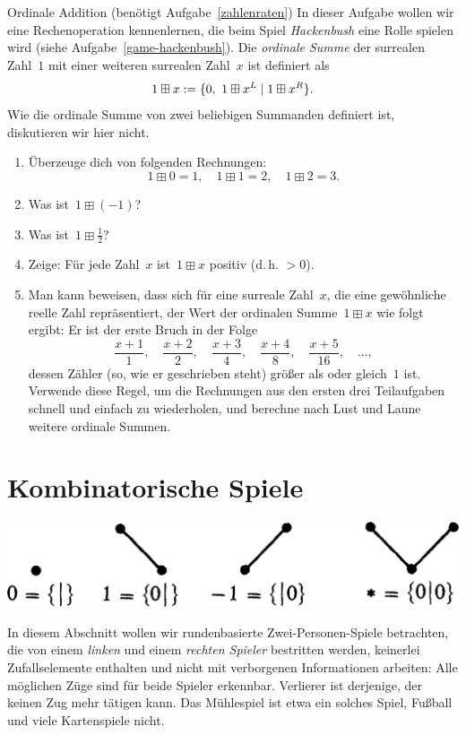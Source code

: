 \documentclass{zirkelblatt}
\newcommand{\head}[1]{\section*{\rmfamily #1}}%
\begin{document}
\begin{aufgabe}{Ordinale Addition (benötigt Aufgabe~\ref{zahlenraten})}
\label{ordinale-addition}
In dieser Aufgabe wollen wir eine Rechenoperation
kennenlernen, die beim Spiel \emph{Hackenbush} eine Rolle spielen wird (siehe
Aufgabe~\ref{game-hackenbush}). Die \emph{ordinale Summe} der surrealen Zahl~$1$ mit
einer weiteren surrealen Zahl~$x$ ist definiert als
\[ 1 \boxplus x := \sur{0,\ 1 \boxplus x^L}{1 \boxplus x^R}. \]
Wie die ordinale Summe von zwei beliebigen Summanden definiert ist,
diskutieren wir hier nicht.
\begin{enumerate}
\item Überzeuge dich von folgenden Rechnungen:
\[ 1 \boxplus 0 = 1, \quad
  1 \boxplus 1 = 2, \quad
  1 \boxplus 2 = 3. \]
\item Was ist~$1 \boxplus (-1)$?
\item Was ist~$1 \boxplus \tfrac{1}{2}$?
\item Zeige: Für jede Zahl~$x$ ist~$1 \boxplus x$ positiv (d.\,h. $> 0$).
\item Man kann beweisen, dass sich für eine surreale Zahl~$x$, die eine gewöhnliche
reelle Zahl repräsentiert, der Wert der ordinalen Summe~$1 \boxplus x$ wie
folgt ergibt: Er ist der erste Bruch in der Folge
\[ \frac{x+1}{1}, \quad
  \frac{x+2}{2}, \quad
  \frac{x+3}{4}, \quad
  \frac{x+4}{8}, \quad
  \frac{x+5}{16}, \quad \ldots, \]
dessen Zähler (so, wie er geschrieben steht) größer als oder gleich~$1$ ist. Verwende diese
Regel, um die Rechnungen aus den ersten drei Teilaufgaben schnell und einfach
zu wiederholen, und berechne nach Lust und Laune weitere ordinale Summen.
\end{enumerate}
\end{aufgabe}


\head{Kombinatorische Spiele}

\begin{center}\includegraphics[scale=0.2]{einfache-spiele}\end{center}

In diesem Abschnitt wollen wir rundenbasierte Zwei-Personen-Spiele betrachten,
die von einem \emph{linken} und einem \emph{rechten Spieler} bestritten werden,
keinerlei Zufallselemente enthalten und nicht mit verborgenen Informationen
arbeiten: Alle möglichen Züge sind für beide Spieler erkennbar. Verlierer ist
derjenige, der keinen Zug mehr tätigen kann. Das Mühlespiel ist etwa ein
solches Spiel, Fußball und viele Kartenspiele nicht.
\end{document}
